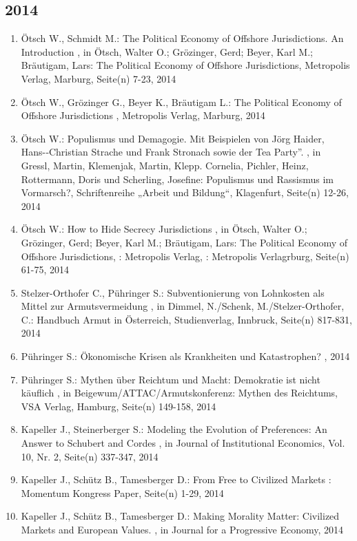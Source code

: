  \subsection*{2014} 
 \begin{enumerate}[leftmargin=*, labelsep=0.5cm] 
	 \item Ötsch W., Schmidt M.:  The Political Economy of Offshore Jurisdictions. An Introduction  , in Ötsch, Walter O.; Grözinger, Gerd; Beyer, Karl M.; Bräutigam, Lars: The Political Economy of Offshore Jurisdictions, Metropolis Verlag, Marburg, Seite(n) 7-23, 2014
	 \item Ötsch W., Grözinger G., Beyer K., Bräutigam L.:  The Political Economy of Offshore Jurisdictions  , Metropolis Verlag, Marburg, 2014
	 \item Ötsch W.:  Populismus und Demagogie. Mit Beispielen von Jörg Haider, Hans-­‐Christian Strache und Frank Stronach sowie der Tea Party”.  , in Gressl, Martin, Klemenjak, Martin, Klepp. Cornelia, Pichler, Heinz, Rottermann, Doris und Scherling, Josefine: Populismus und Rassismus im Vormarsch?, Schriftenreihe „Arbeit und Bildung“, Klagenfurt, Seite(n) 12-26, 2014
	 \item Ötsch W.:  How to Hide Secrecy Jurisdictions  , in Ötsch, Walter O.; Grözinger, Gerd; Beyer, Karl M.; Bräutigam, Lars: The Political Economy of Offshore Jurisdictions, : Metropolis Verlag, : Metropolis Verlagrburg, Seite(n) 61-75, 2014
	 \item Stelzer-Orthofer C., Pühringer S.:  Subventionierung von Lohnkosten als Mittel zur Armutsvermeidung  , in Dimmel, N./Schenk, M./Stelzer-Orthofer, C.: Handbuch Armut in Österreich, Studienverlag, Innbruck, Seite(n) 817-831, 2014
	 \item Pühringer S.:  Ökonomische Krisen als Krankheiten und Katastrophen?  , 2014
	 \item Pühringer S.:  Mythen über Reichtum und Macht: Demokratie ist nicht käuflich  , in Beigewum/ATTAC/Armutskonferenz: Mythen des Reichtums, VSA Verlag, Hamburg, Seite(n) 149-158, 2014
	 \item Kapeller J., Steinerberger S.:  Modeling the Evolution of Preferences: An Answer to Schubert and Cordes  , in Journal of Institutional Economics, Vol. 10, Nr. 2, Seite(n) 337-347, 2014
	 \item Kapeller J., Schütz B., Tamesberger D.:  From Free to Civilized Markets  : Momentum Kongress Paper, Seite(n) 1-29, 2014
	 \item Kapeller J., Schütz B., Tamesberger D.:  Making Morality Matter: Civilized Markets and European Values.  , in Journal for a Progressive Economy, 2014

\end{enumerate}
